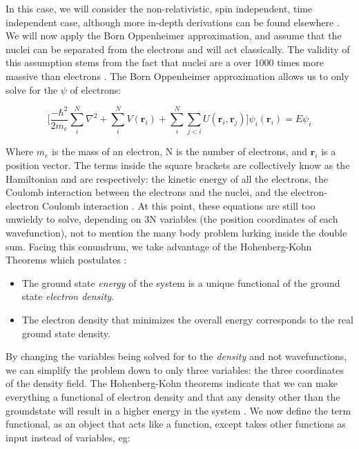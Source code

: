 In this case, we will consider the non-relativistic, spin independent, time independent case, although more in-depth derivations can be found elsewhere \cite{tddft}.  We will now apply the Born Oppenheimer approximation, and assume that the nuclei can be separated from the electrons and will act classically. The validity of this assumption stems from the fact that nuclei are a  over 1000 times more massive than electrons \cite{graff_direct_1980}.  The Born Oppenheimer approximation allows us to only solve for the $\psi$ of electrons:

\begin{equation}
	\bigg[\frac{-\hbar^2}{2m_e}\sum_{i}^{N} \nabla^2 +\sum_{i}^{N} V(\textbf{r}_i) + \sum_{i}^{N}\sum_{j <i}U(\textbf{r}_i,\textbf{r}_j) \bigg] \psi_i(\textbf{r}_i) = E \psi_i
\end{equation}

Where $m_e$ is the mass of an electron, N is the number of electrons, and $\textbf{r}_i$ is a position vector. The terms inside the square brackets are collectively know as the Hamiltonian and are respectively: the kinetic energy of all the electrons, the Coulomb interaction between the electrons and the nuclei, and the electron-electron Coulomb interaction  \cite{sholl_density_2009}. At this point, these equations are still too unwieldy to solve, depending on 3N variables (the position coordinates of each wavefunction), not to mention the many body problem lurking inside the double sum.  Facing this conundrum, we take advantage of the Hohenberg-Kohn Theorems which postulates \cite{hohenberg_inhomogeneous_1964}:
\begin{itemize}
	\item  The ground state \textit{energy} of the system is a unique functional of the ground state \textit{electron density}.
	\item The electron density that minimizes the overall energy corresponds to the real ground state density.  
\end{itemize}

By changing the variables being solved for to the \textit{density} and not wavefunctions, we can simplify the problem down to only three variables: the three coordinates of the density field.  The Hohenberg-Kohn theorems indicate that we can make everything a functional of electron density and that any density other than the groundstate will result in a higher energy in the system \cite{parr_density_1983}.  We now define the term functional, as an object that acts like a function, except takes other functions as input instead of variables, eg:

